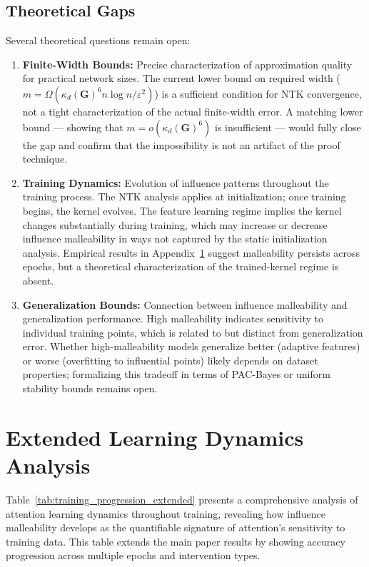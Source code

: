 \documentclass{article}
\theoremstyle{plain}
\theoremstyle{definition}
\theoremstyle{remark}
\begin{document}
\subsection{Theoretical Gaps}

Several theoretical questions remain open:

\begin{enumerate}
\item \textbf{Finite-Width Bounds:} Precise characterization of approximation quality for practical network sizes. The current lower bound on required width ($m = \Omega(\kappa_d(\mathbf{G})^6 n \log n / \varepsilon^2)$) is a sufficient condition for NTK convergence, not a tight characterization of the actual finite-width error. A matching lower bound --- showing that $m = o(\kappa_d(\mathbf{G})^6)$ is insufficient --- would fully close the gap and confirm that the impossibility is not an artifact of the proof technique.
\item \textbf{Training Dynamics:} Evolution of influence patterns throughout the training process. The NTK analysis applies at initialization; once training begins, the kernel evolves. The feature learning regime implies the kernel changes substantially during training, which may increase or decrease influence malleability in ways not captured by the static initialization analysis. Empirical results in Appendix~\ref{app:learning_dynamics} suggest malleability persists across epochs, but a theoretical characterization of the trained-kernel regime is absent.
\item \textbf{Generalization Bounds:} Connection between influence malleability and generalization performance. High malleability indicates sensitivity to individual training points, which is related to but distinct from generalization error. Whether high-malleability models generalize better (adaptive features) or worse (overfitting to influential points) likely depends on dataset properties; formalizing this tradeoff in terms of PAC-Bayes or uniform stability bounds remains open.
\end{enumerate}

\section{Extended Learning Dynamics Analysis}
\label{app:learning_dynamics}

Table~\ref{tab:training_progression_extended} presents a comprehensive analysis of attention learning dynamics throughout training, revealing how influence malleability develops as the quantifiable signature of attention's sensitivity to training data. This table extends the main paper results by showing accuracy progression across multiple epochs and intervention types.
\end{document}
